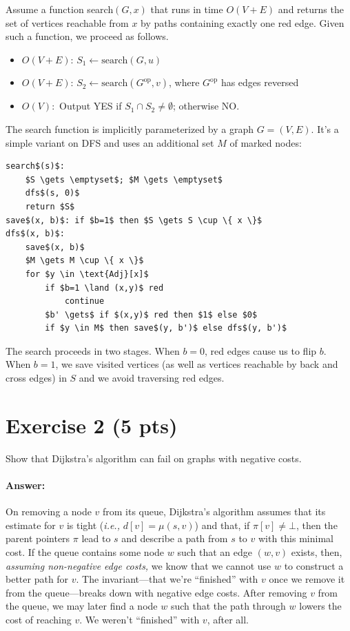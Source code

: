 \documentclass[a4paper]{article}
\newcommand{\ie}{\emph{i.e.,} }
\begin{document}
Assume a function search$(G, x)$ that runs in time $O(V+E)$ and returns the set of vertices reachable from $x$ by paths containing exactly one red edge.
Given such a function, we proceed as follows.
\begin{itemize}
	\item
	$O(V+E)$: $S_1 \gets \text{search}(G, u)$

	\item
	$O(V+E)$: $S_2 \gets \text{search}(G^\text{op}, v)$, where $G^\text{op}$ has edges reversed

	\item
	$O(V):$ Output YES if $S_1 \cap S_2 \not= \emptyset$; otherwise NO.
\end{itemize}
The search function is implicitly parameterized by a graph $G=(V,E)$.
It's a simple variant on DFS and uses an additional set $M$ of marked nodes:
\begin{lstlisting}[numbers=none,xleftmargin=1cm]
search$(s)$:
	$S \gets \emptyset$; $M \gets \emptyset$
	dfs$(s, 0)$
	return $S$
save$(x, b)$: if $b=1$ then $S \gets S \cup \{ x \}$
dfs$(x, b)$:
	save$(x, b)$
	$M \gets M \cup \{ x \}$
	for $y \in \text{Adj}[x]$
		if $b=1 \land (x,y)$ red
			continue
		$b' \gets$ if $(x,y)$ red then $1$ else $0$
		if $y \in M$ then save$(y, b')$ else dfs$(y, b')$\end{lstlisting}
The search proceeds in two stages.
When $b=0$, red edges cause us to flip $b$.
When $b=1$, we save visited vertices (as well as vertices reachable by back and cross edges) in $S$ and we avoid traversing red edges.

\section*{Exercise 2 (5 pts)}

Show that Dijkstra's algorithm can fail on graphs with negative costs.

\paragraph{Answer:}
On removing a node $v$ from its queue, Dijkstra's algorithm assumes that its estimate for $v$ is tight (\ie $d[v] = \mu(s, v)$) and that, if $\pi[v] \not= \bot$, then the parent pointers $\pi$ lead to $s$ and describe a path from $s$ to $v$ with this minimal cost.
If the queue contains some node $w$ such that an edge $(w, v)$ exists, then, \emph{assuming non-negative edge costs,} we know that we cannot use $w$ to construct a better path for $v$.
The invariant---that we're ``finished'' with $v$ once we remove it from the queue---breaks down with negative edge costs.
After removing $v$ from the queue, we may later find a node $w$ such that the path through $w$ lowers the cost of reaching $v$.
We weren't ``finished'' with $v$, after all.
\end{document}
